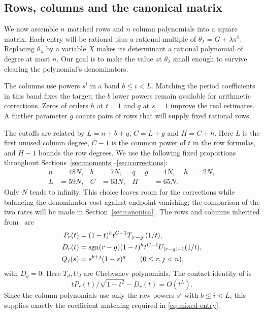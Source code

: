 \subsection{Rows, columns and the canonical matrix}

We now assemble $n$ matched rows and $n$ column polynomials into a square
matrix. Each entry will be rational plus a rational multiple of
$\theta_\lambda=G+\lambda\pi^2$. Replacing $\theta_\lambda$ by a variable
$X$ makes its determinant a rational polynomial of degree at most $n$.
Our goal is to make the value at $\theta_\lambda$ small enough to survive
clearing the polynomial's denominators.

The columns use powers $s^i$ in a band $b\le i<L$. Matching the period
coefficients in this band fixes the target; the $b$ lower powers remain
available for arithmetic corrections. Zeros of orders $h$ at $t=1$ and
$q$ at $s=1$ improve the real estimates. A further parameter $g$ counts
pairs of rows that will supply fixed rational rows.

The cutoffs are related by $L=n+b+q$, $C=L+g$ and $H=C+h$.
Here $L$ is the first unused column degree, $C-1$ is the common power
of $t$ in the row formulas, and $H-1$ bounds the row degrees. We use
the following fixed proportions throughout
Sections~\ref{sec:moments}--\ref{sec:corrections}:
\begin{equation}\label{eq:moment-scale}
 \begin{aligned}
 n&=48N,& b&=7N,& q=g&=4N,& h&=2N,\\
 L&=59N,& C&=63N,& H&=65N.&&
 \end{aligned}
\end{equation}
Only $N$ tends to infinity. This choice leaves room for the corrections
while balancing the denominator cost against endpoint vanishing; the
comparison of the two rates will be made in Section~\ref{sec:canonical}.
The rows and columns inherited from~\cite{OpenAI} are
\begin{align}
 P_r(t)&=(1-t)^h t^{C-1}T_{|r-g|}(1/t),\nonumber\\
 D_r(t)&=\operatorname{sgn}(r-g)(1-t)^h t^{C-1}U_{|r-g|-1}(1/t),\label{eq:moment-rows}\\
 Q_j(s)&=s^{b+j}(1-s)^q \qquad(0\le r,j<n),\nonumber
\end{align}
with $D_g=0$. Here $T_d,U_d$ are Chebyshev polynomials. The contact
identity of \cite[(5)]{OpenAI} is
\[
 tP_r(t)/\sqrt{1-t^2}-D_r(t)=O(t^L).
\]
Since the column polynomials use only the raw powers $s^i$ with
$b\le i<L$, this supplies exactly the coefficient matching required
in \eqref{eq:mixed-entry}.

